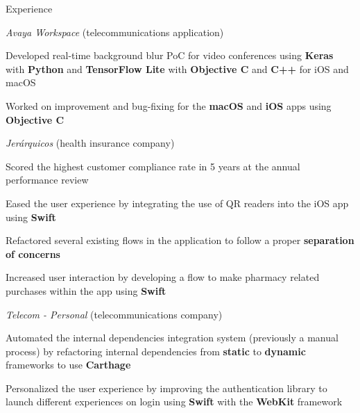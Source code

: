 \documentclass{curriculum}
\begin{document}
\begin{cvsection}{Experience}
\begin{sectionitemlist}
        \item{\textit{Avaya Workspace} (telecommunications application)}
            \begin{sectionitemlist}
            \item{
                Developed real-time background blur PoC for video conferences using
                \textbf{Keras} with \textbf{Python} and \textbf{TensorFlow Lite}
                with \textbf{Objective C} and \textbf{C++} for iOS and macOS
            }
            \item{
                Worked on improvement and bug-fixing for the \textbf{macOS}
                and \textbf{iOS} apps using \textbf{Objective C}
            }
            \end{sectionitemlist}

        \item{\textit{Jerárquicos} (health insurance company)}
            \begin{sectionitemlist}
            \item{
                Scored the highest customer compliance rate
                in 5 years at the annual performance review
            }
            \item{
                Eased the user experience by integrating the use of
                QR readers into the iOS app using \textbf{Swift}
            }
            \item{
                Refactored several existing flows in the application
                to follow a proper \textbf{separation of concerns}
            }
            \item {
                Increased user interaction by developing a flow to make pharmacy
                related purchases within the app using \textbf{Swift}
            }
            \end{sectionitemlist}

        \item{\textit{Telecom - Personal} (telecommunications company)}
            \begin{sectionitemlist}
            \item{
                Automated the internal dependencies integration system
                (previously a manual process) by refactoring internal dependencies
                from \textbf{static} to \textbf{dynamic} frameworks to use \textbf{Carthage}
            }
            \item{
                Personalized the user experience by improving the authentication
                library to launch different experiences on login using
                \textbf{Swift} with the \textbf{WebKit} framework
            }
            \end{sectionitemlist}


\end{sectionitemlist}
\end{cvsection}
\end{document}
